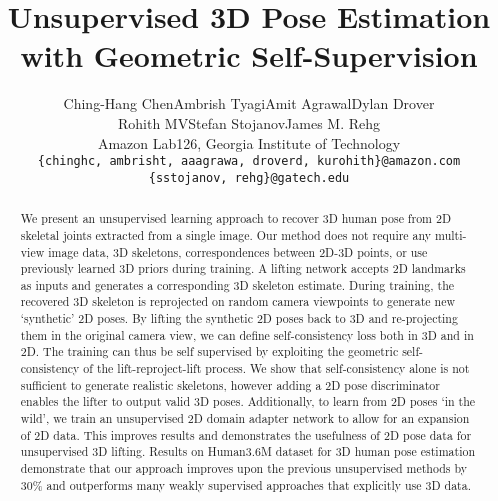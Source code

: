 \documentclass[10pt,twocolumn,letterpaper]{article}
\begin{document}
\title{Unsupervised 3D Pose Estimation with Geometric Self-Supervision \vspace{-0.3cm}} 


\author{Ching-Hang Chen\qquad Ambrish Tyagi\qquad Amit Agrawal\qquad Dylan Drover\\ \vspace{-10pt}
	Rohith MV\qquad Stefan Stojanov\qquad James M. Rehg\qquad
	\vspace{6pt}\\
	Amazon Lab126, Georgia Institute of Technology\\
	{\tt\small \{chinghc, ambrisht, aaagrawa, droverd, kurohith\}@amazon.com \{sstojanov, rehg\}@gatech.edu}
\vspace{-15pt}
}






\maketitle
\begin{abstract}
\label{sect:abstract}
We present an unsupervised learning approach to recover 3D human pose from 2D skeletal joints extracted from a single image. Our method does not require any multi-view image data, 3D skeletons, correspondences between 2D-3D points, or use previously learned 3D priors during training. A lifting network accepts 2D landmarks as inputs and generates a corresponding 3D skeleton estimate. During training, the recovered 3D skeleton is reprojected on random camera viewpoints to generate new `synthetic' 2D poses. By lifting the synthetic 2D poses back to 3D and re-projecting them in the original camera view, we can define self-consistency loss both in 3D and in 2D. The training can thus be self supervised by exploiting the geometric self-consistency of the lift-reproject-lift process. We show that self-consistency alone is not sufficient to generate realistic skeletons, however adding a 2D pose discriminator enables the lifter to output valid 3D poses. Additionally, to learn from 2D poses `in the wild', we train an unsupervised 2D domain adapter network to allow for an expansion of 2D data. This improves results and demonstrates the usefulness of 2D pose data for unsupervised 3D lifting. Results on Human3.6M dataset for 3D human pose estimation demonstrate that our approach improves upon the previous unsupervised methods by 30\% and outperforms many weakly supervised approaches that explicitly use 3D data.
\vspace{-1.5ex}


\vspace{-3ex}
\end{abstract}
\end{document}
